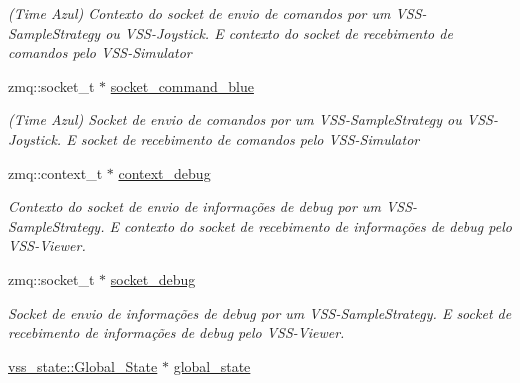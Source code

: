 \begin{DoxyCompactItemize}
\begin{DoxyCompactList}\small\item\em (Time Azul) Contexto do socket de envio de comandos por um V\+S\+S-\/\+Sample\+Strategy ou V\+S\+S-\/\+Joystick. E contexto do socket de recebimento de comandos pelo V\+S\+S-\/\+Simulator \end{DoxyCompactList}\item 
zmq\+::socket\+\_\+t $\ast$ \hyperlink{classInterface_a2853bd703e1eb4f7ebdb88a21537005f}{socket\+\_\+command\+\_\+blue}\hypertarget{classInterface_a2853bd703e1eb4f7ebdb88a21537005f}{}\label{classInterface_a2853bd703e1eb4f7ebdb88a21537005f}

\begin{DoxyCompactList}\small\item\em (Time Azul) Socket de envio de comandos por um V\+S\+S-\/\+Sample\+Strategy ou V\+S\+S-\/\+Joystick. E socket de recebimento de comandos pelo V\+S\+S-\/\+Simulator \end{DoxyCompactList}\item 
zmq\+::context\+\_\+t $\ast$ \hyperlink{classInterface_ae7b29a3a106e879f2fe60f0176088082}{context\+\_\+debug}\hypertarget{classInterface_ae7b29a3a106e879f2fe60f0176088082}{}\label{classInterface_ae7b29a3a106e879f2fe60f0176088082}

\begin{DoxyCompactList}\small\item\em Contexto do socket de envio de informações de debug por um V\+S\+S-\/\+Sample\+Strategy. E contexto do socket de recebimento de informações de debug pelo V\+S\+S-\/\+Viewer. \end{DoxyCompactList}\item 
zmq\+::socket\+\_\+t $\ast$ \hyperlink{classInterface_a1d7a633715bcdd79ede3ef42e251fcfd}{socket\+\_\+debug}\hypertarget{classInterface_a1d7a633715bcdd79ede3ef42e251fcfd}{}\label{classInterface_a1d7a633715bcdd79ede3ef42e251fcfd}

\begin{DoxyCompactList}\small\item\em Socket de envio de informações de debug por um V\+S\+S-\/\+Sample\+Strategy. E socket de recebimento de informações de debug pelo V\+S\+S-\/\+Viewer. \end{DoxyCompactList}\item 
\hyperlink{classvss__state_1_1Global__State}{vss\+\_\+state\+::\+Global\+\_\+\+State} $\ast$ \hyperlink{classInterface_ac488bcc6708103cb36d132c895efa7a0}{global\+\_\+state}\hypertarget{classInterface_ac488bcc6708103cb36d132c895efa7a0}{}\label{classInterface_ac488bcc6708103cb36d132c895efa7a0}


\end{DoxyCompactItemize}
